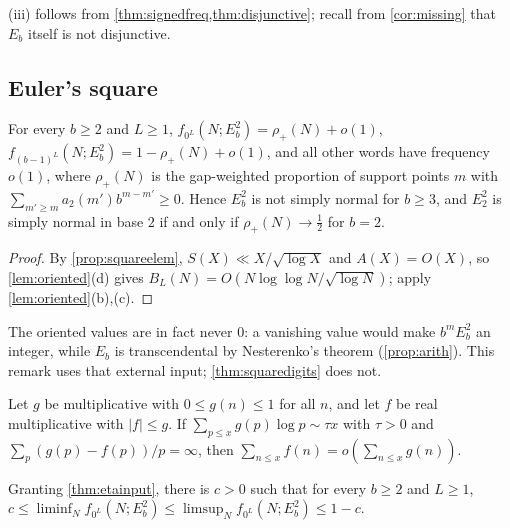 \documentclass[11pt]{article}
\newcommand{\LL}{\log\log N}
\begin{document}
(iii) follows from \cref{thm:signedfreq,thm:disjunctive}; recall from
\cref{cor:missing} that $E_b$ itself is not disjunctive.

\subsection{Euler's square}\label{subsec:squaredigits}

\begin{theorem}\label{thm:squaredigits}
For every $b\ge2$ and $L\ge1$, $f_{0^L}(N;E_b^2)=\rho_+(N)+o(1)$,
$f_{(b-1)^L}(N;E_b^2)=1-\rho_+(N)+o(1)$, and all other words have frequency $o(1)$, where
$\rho_+(N)$ is the gap-weighted proportion of support points $m$ with
$\sum_{m'\ge m}a_2(m')b^{m-m'}\ge0$. Hence $E_b^2$ is not simply normal for $b\ge3$, and $E_2^2$ is simply
normal in base $2$ if and only if $\rho_+(N)\to\frac12$ for $b=2$.
\end{theorem}

\begin{proof}
By \cref{prop:squareelem}, $S(X)\ll X/\sqrt{\log X}$ and $A(X)=O(X)$, so
\cref{lem:oriented}(d) gives $B_L(N)=O(N\LL/\sqrt{\log N})$; apply \cref{lem:oriented}(b),(c).
\end{proof}

The oriented values are in fact never $0$: a vanishing value would make $b^mE_b^2$ an integer, while
$E_b$ is transcendental by Nesterenko's theorem (\cref{prop:arith}). This remark uses that external
input; \cref{thm:squaredigits} does not.

\begin{theorem}\label{thm:wirsing67}
Let $g$ be multiplicative with $0\le g(n)\le1$ for all $n$, and let $f$ be real multiplicative with
$|f|\le g$. If $\sum_{p\le x}g(p)\log p\sim\tau x$ with $\tau>0$ and
$\sum_p(g(p)-f(p))/p=\infty$, then $\sum_{n\le x}f(n)=o(\sum_{n\le x}g(n))$.
\end{theorem}

\begin{theorem}\label{thm:squarebothwords}
Granting \cref{thm:etainput}, there is $c>0$ such that for every $b\ge2$ and $L\ge1$,
$c\le\liminf_Nf_{0^L}(N;E_b^2)\le\limsup_Nf_{0^L}(N;E_b^2)\le1-c$.
\end{theorem}
\end{document}
